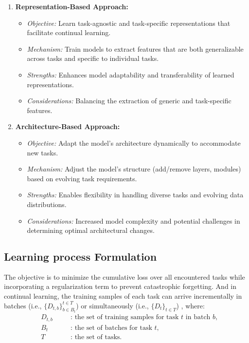 \documentclass[12pt,a4paper]{article}
\begin{document}
\begin{enumerate}
	\item \textbf{Representation-Based Approach:}
	\begin{itemize}
		\item \textit{Objective:} Learn task-agnostic and task-specific representations that facilitate continual learning.
		\item \textit{Mechanism:} Train models to extract features that are both generalizable across tasks and specific to individual tasks.
		\item \textit{Strengths:} Enhances model adaptability and transferability of learned representations.
		\item \textit{Considerations:} Balancing the extraction of generic and task-specific features.
	\end{itemize}
	
	\item \textbf{Architecture-Based Approach:}
	\begin{itemize}
		\item \textit{Objective:} Adapt the model's architecture dynamically to accommodate new tasks.
		\item \textit{Mechanism:} Adjust the model's structure (add/remove layers, modules) based on evolving task requirements.
		\item \textit{Strengths:} Enables flexibility in handling diverse tasks and evolving data distributions.
		\item \textit{Considerations:} Increased model complexity and potential challenges in determining optimal architectural changes.
	\end{itemize}
\end{enumerate}


\subsection*{Learning process Formulation} The objective is to minimize the cumulative loss over all encountered tasks while incorporating a regularization term to prevent catastrophic forgetting. And in continual learning, the training samples of each task can arrive incrementally in batches (i.e., $\{D_{t,b}\}_{b \in B_t}^{t \in T}$) or simultaneously (i.e., $\{D_t\}_{t \in T}$) \cite{contlearning}, where:
\begin{align*}
	&D_{t,b} \quad &&\text{: the set of training samples for task $t$ in batch $b$,} \\
	&B_t \quad &&\text{: the set of batches for task $t$,} \\
	&T \quad &&\text{: the set of tasks.}
\end{align*}
\end{document}
